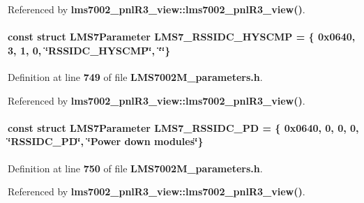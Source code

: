 Referenced by {\bf lms7002\+\_\+pnl\+R3\+\_\+view\+::lms7002\+\_\+pnl\+R3\+\_\+view()}.

\paragraph[{L\+M\+S7\+\_\+\+R\+S\+S\+I\+D\+C\+\_\+\+H\+Y\+S\+C\+MP}]{\setlength{\rightskip}{0pt plus 5cm}const struct {\bf L\+M\+S7\+Parameter} L\+M\+S7\+\_\+\+R\+S\+S\+I\+D\+C\+\_\+\+H\+Y\+S\+C\+MP = \{ 0x0640, 3, 1, 0, \char`\"{}\+R\+S\+S\+I\+D\+C\+\_\+\+H\+Y\+S\+C\+M\+P\char`\"{}, \char`\"{}\char`\"{}\}\hspace{0.3cm}{\ttfamily [static]}}\label{LMS7002M__parameters_8h_a261745b9f1e04e5e953464cd7ac1d37d}


Definition at line {\bf 749} of file {\bf L\+M\+S7002\+M\+\_\+parameters.\+h}.



Referenced by {\bf lms7002\+\_\+pnl\+R3\+\_\+view\+::lms7002\+\_\+pnl\+R3\+\_\+view()}.

\paragraph[{L\+M\+S7\+\_\+\+R\+S\+S\+I\+D\+C\+\_\+\+PD}]{\setlength{\rightskip}{0pt plus 5cm}const struct {\bf L\+M\+S7\+Parameter} L\+M\+S7\+\_\+\+R\+S\+S\+I\+D\+C\+\_\+\+PD = \{ 0x0640, 0, 0, 0, \char`\"{}\+R\+S\+S\+I\+D\+C\+\_\+\+P\+D\char`\"{}, \char`\"{}\+Power down modules\char`\"{}\}\hspace{0.3cm}{\ttfamily [static]}}\label{LMS7002M__parameters_8h_af7a93be8e3537df1f2facca59e5651e9}


Definition at line {\bf 750} of file {\bf L\+M\+S7002\+M\+\_\+parameters.\+h}.



Referenced by {\bf lms7002\+\_\+pnl\+R3\+\_\+view\+::lms7002\+\_\+pnl\+R3\+\_\+view()}.

